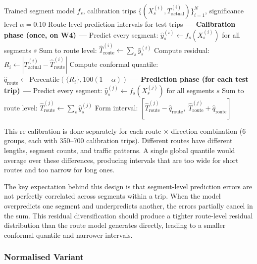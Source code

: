 \documentclass[12pt, a4paper, oneside]{report}
\begin{document}
\begin{algorithm}[H]
\caption{Route-Level Re-Calibration from Segment Predictions}
\label{alg:route_recal}
\begin{algorithmic}[1]
\REQUIRE Trained segment model $f_s$, calibration trips $\{(X_s^{(i)}, T_{\text{actual}}^{(i)})\}_{i=1}^{N}$, significance level $\alpha = 0.10$
\ENSURE Route-level prediction intervals for test trips
\STATE \textbf{--- Calibration phase (once, on W4) ---}
    \STATE Predict every segment: $\hat{y}_s^{(i)} \leftarrow f_s(X_s^{(i)})$ for all segments $s$
    \STATE Sum to route level: $\hat{T}_{\text{route}}^{(i)} \leftarrow \sum_s \hat{y}_s^{(i)}$
    \STATE Compute residual: $R_i \leftarrow |T_{\text{actual}}^{(i)} - \hat{T}_{\text{route}}^{(i)}|$
\ENDFOR
\STATE Compute conformal quantile: $\hat{q}_{\text{route}} \leftarrow \text{Percentile}(\{R_i\}, 100(1-\alpha))$
\STATE
\STATE \textbf{--- Prediction phase (for each test trip) ---}
    \STATE Predict every segment: $\hat{y}_s^{(j)} \leftarrow f_s(X_s^{(j)})$ for all segments $s$
    \STATE Sum to route level: $\hat{T}_{\text{route}}^{(j)} \leftarrow \sum_s \hat{y}_s^{(j)}$
    \STATE Form interval: $[\hat{T}_{\text{route}}^{(j)} - \hat{q}_{\text{route}},\; \hat{T}_{\text{route}}^{(j)} + \hat{q}_{\text{route}}]$
\ENDFOR
\end{algorithmic}
\end{algorithm}

This re-calibration is done separately for each route $\times$ direction combination (6 groups, each with 350--700 calibration trips). Different routes have different lengths, segment counts, and traffic patterns. A single global quantile would average over these differences, producing intervals that are too wide for short routes and too narrow for long ones.

The key expectation behind this design is that segment-level prediction errors are not perfectly correlated across segments within a trip. When the model overpredicts one segment and underpredicts another, the errors partially cancel in the sum. This residual diversification should produce a tighter route-level residual distribution than the route model generates directly, leading to a smaller conformal quantile and narrower intervals.

\subsubsection{Normalised Variant}
\end{document}
